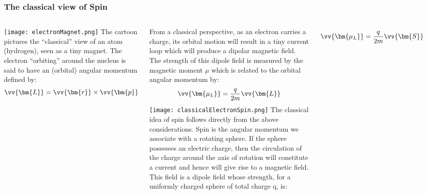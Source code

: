 \begin{frame}
\frametitle{The classical view of Spin}
\begin{columns}
 
\texttt{[image: electronMagnet.png]}
The cartoon pictures the ``classical'' view of an atom (hydrogen), seen as a tiny magnet. The electron ``orbiting'' around the nucleus is said to have an (orbital) angular momentum defined by:
\[
\vv{\bm{L}} = \vv{\bm{r}} \times \vv{\bm{p}} 
\]

From a classical perspective, as an electron carries a charge, its orbital motion will result in a tiny current loop which will produce a dipolar magnetic field. The strength of this dipole field is measured by the magnetic moment $\mu$ which is related to the orbital angular momentum by:
\[
\vv{\bm{\mu_L}} = \frac{q}{2m}\vv{\bm{L}} 
\]
\texttt{[image: classicalElectronSpin.png]}
The classical idea of spin follows directly from the above considerations. Spin is the angular momentum we associate with a rotating sphere. If the sphere possesses an electric charge, then the circulation of the charge around the axis of rotation will constitute a current and hence will give rise to a magnetic field. This field is a dipole field whose strength, for a uniformly charged sphere of total charge q, is:

\[
\vv{\bm{\mu_L}} = \frac{q}{2m}\vv{\bm{S}} 
\]
\end{columns}



\end{frame}
